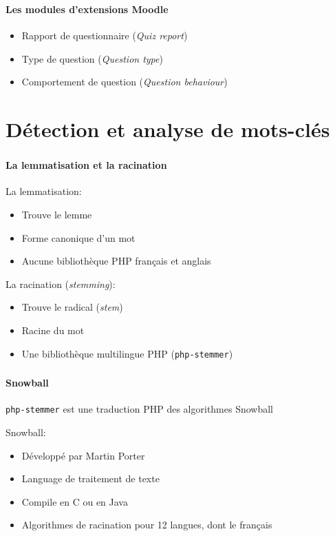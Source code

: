 \documentclass{beamer}
\begin{document}
  \begin{frame}
  \frametitle{\insertsection}
  \framesubtitle{Les modules d'extensions Moodle}
  \begin{itemize}
    \item Rapport de questionnaire (\textit{Quiz report})
    \item Type de question (\textit{Question type})
    \item Comportement de question (\textit{Question behaviour})
  \end{itemize}
  \end{frame}
  
  \section[Mots-cl\'es]{D\'etection et analyse de mots-cl\'es}
  \begin{frame}
  \frametitle{\insertsection}
  \framesubtitle{La lemmatisation et la racination}
  La lemmatisation:
  \begin{itemize}
    \item Trouve le lemme
    \item Forme canonique d'un mot
    \item Aucune biblioth\`eque PHP fran\c{c}ais et anglais
  \end{itemize}
  
  \medskip
  
  La racination (\textit{stemming}):
  \begin{itemize}
    \item Trouve le radical (\textit{stem})
    \item Racine du mot
    \item Une biblioth\`eque multilingue PHP (\texttt{php-stemmer})
  \end{itemize}
  \end{frame}
  
  \begin{frame}
  \frametitle{\insertsection}
  \framesubtitle{Snowball}
  \texttt{php-stemmer} est une traduction PHP des algorithmes Snowball
  
  \bigskip
  
  Snowball:
  \begin{itemize}
    \item D\'evelopp\'e par Martin Porter
    \item Language de traitement de texte
    \item Compile en C ou en Java
    \item Algorithmes de racination pour 12 langues, dont le fran\c{c}ais
  \end{itemize}
  \end{frame}
  
\end{document}
